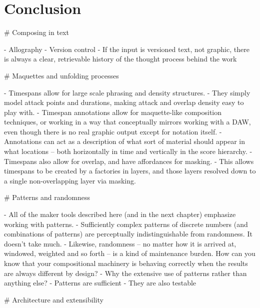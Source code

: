 \chapter{Conclusion}
\label{chap:conclusion}

\begin{markdown}

# Composing in text

- Allography
- Version control
- If the input is versioned text, not graphic, there is always a clear,
  retrievable history of the thought process behind the work

# Maquettes and unfolding processes

- Timespans allow for large scale phrasing and density structures.
- They simply model attack points and durations, making attack and overlap
  density easy to play with.
- Timespan annotations allow for maquette-like composition techniques, or
  working in a way that conceptually mirrors working with a DAW, even though
  there is no real graphic output except for notation itself.
- Annotations can act as a description of what sort of material should appear
  in what locations -- both horizontally in time and vertically in the score
  hierarchy.
- Timespans also allow for overlap, and have affordances for masking.
- This allows timespans to be created by a factories in layers, and those
  layers resolved down to a single non-overlapping layer via masking.

# Patterns and randomness

- All of the maker tools described here (and in the next chapter) emphasize
  working with patterns.
- Sufficiently complex patterns of discrete numbers (and combinations of
  patterns) are perceptually indistinguishable from randomness. It doesn't
  take much.
- Likewise, randomness -- no matter how it is arrived at, windowed, weighted
  and so forth -- is a kind of maintenance burden. How can you know that
  your compositional machinery is behaving correctly when the results are
  always different by design?
- Why the extensive use of patterns rather than anything else?
- Patterns are sufficient
- They are also testable

# Architecture and extensibility


\end{markdown}
